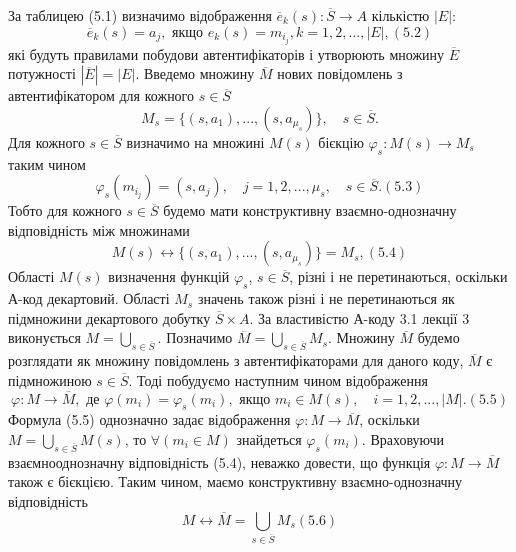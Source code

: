 За таблицею (5.1) визначимо відображення $\overline{e}_k(s): \overline{S} \rightarrow A$ кількістю $|E|$:
\begin{equation*}
    \overline{e}_k(s) = a_j, \text{ якщо } e_k(s) = m_{i_j}, k = 1, 2, ..., |E|, (5.2)
\end{equation*}
які будуть правилами побудови автентифікаторів і утворюють множину
$\overline{E}$ потужності $|\overline{E}| = |E|$. Введемо множину $\overline{M}$ нових повідомлень з
автентифікатором для кожного $s \in \overline{S}$
\begin{equation*}
    M_s = \{(s, a_1), ..., (s, a_{\mu_s})\}, \quad s \in \overline{S}.
\end{equation*}
Для кожного $s \in \overline{S}$ визначимо на множині $M(s)$ бієкцію $\varphi_s: M(s) \rightarrow M_s$
таким чином
\begin{equation}
    \varphi_s(m_{i_j}) = (s, a_j), \quad j = 1, 2, ..., \mu_s, \quad s \in \overline{S}. (5.3)
\end{equation}
Тобто для кожного $s \in \overline{S}$ будемо мати конструктивну взаємно-однозначну
відповідність між множинами
\begin{equation}
    M(s) \leftrightarrow \{(s, a_1), ..., (s, a_{\mu_s})\} = M_s, (5.4)
\end{equation}
Області $M(s)$ визначення функцій $\varphi_{s}$, $s \in \overline{S}$, різні і не перетинаються,
оскільки А-код декартовий. Області $M_s$ значень також різні і не перетинаються
як підмножини декартового добутку $\overline{S} \times A$. За властивістю А-коду 3.1 лекції 3
виконується $M = \bigcup\limits_{s \in \overline{S}}$. Позначимо
$\overline{M} = \bigcup\limits_{s \in \overline{S}} M_s$. Множину $\overline{M}$
будемо розглядати як множину повідомлень з автентифікаторами для даного
коду, $\overline{M}$ є підмножиною $s \in \overline{S}$. Тоді побудуємо наступним чином відображення
\begin{equation}
    \varphi: M \rightarrow \overline{M}, \text{ де } \varphi(m_i) = \varphi_s(m_i), \text{ якщо } m_i \in M(s), \quad i = 1, 2, ..., |M|. (5.5)
\end{equation}
Формула (5.5) однозначно задає відображення $\varphi: M \rightarrow \overline{M}$, оскільки
$M = \bigcup\limits_{s \in \overline{S}} M(s)$, то $\forall (m_i \in M)$ знайдеться $\varphi_s(m_i)$.
Враховуючи взаємнооднозначну відповідність (5.4), неважко довести, що функція $\varphi: M \rightarrow \overline{M}$ також є
бієкцією. Таким чином, маємо конструктивну взаємно-однозначну
відповідність
\begin{equation}
    M \leftrightarrow \overline{M} = \bigcup\limits_{s \in \overline{S}} M_s (5.6)
\end{equation}
